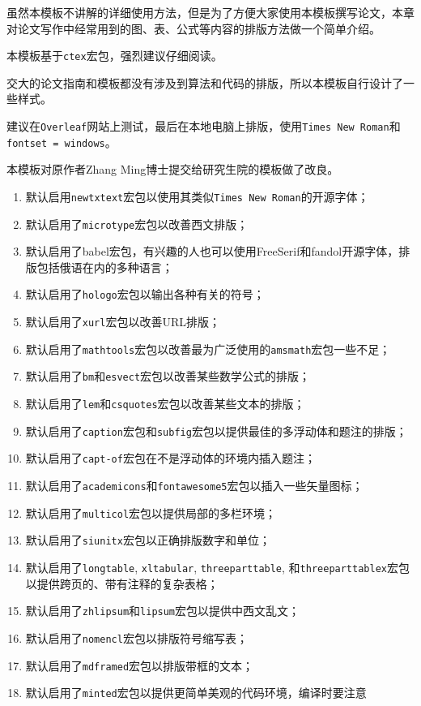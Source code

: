 

虽然本模板不讲解的详细使用方法，但是为了方便大家使用本模板撰写论文，本章对论文写作中经常用到的{\heiti 图、表、公式}等内容的排版方法做一个简单介绍。

\begin{mdframed}
本模板基于\texttt{ctex}宏包，强烈建议仔细阅读。

交大的论文指南和模板都没有涉及到算法和代码的排版，所以本模板自行设计了一些样式。

建议在\texttt{Overleaf}网站上测试，最后在本地电脑上排版，使用\texttt{Times New Roman}和\texttt{fontset = windows}。

本模板对原作者Zhang Ming博士提交给研究生院的模板做了改良。
\begin{enumerate}
  \item 默认启用\texttt{newtxtext}宏包以使用其类似\texttt{Times New Roman}的开源字体；
  \item 默认启用了\texttt{microtype}宏包以改善西文排版；
  \item 默认启用了babel宏包，有兴趣的人也可以使用FreeSerif和fandol开源字体，排版包括俄语在内的多种语言；
  \item 默认启用了\texttt{hologo}宏包以输出各种有关的符号；
  \item 默认启用了\texttt{xurl}宏包以改善URL排版；
  \item 默认启用了\texttt{mathtools}宏包以改善最为广泛使用的\texttt{amsmath}宏包一些不足；
  \item 默认启用了\texttt{bm}和\texttt{esvect}宏包以改善某些数学公式的排版；
  \item 默认启用了\texttt{lem}和\texttt{csquotes}宏包以改善某些文本的排版；
  \item 默认启用了\texttt{caption}宏包和\texttt{subfig}宏包以提供最佳的多浮动体和题注的排版；
  \item 默认启用了\texttt{capt-of}宏包在不是浮动体的环境内插入题注；
  \item 默认启用了\texttt{academicons}和\texttt{fontawesome5}宏包以插入一些矢量图标；
  \item 默认启用了\texttt{multicol}宏包以提供局部的多栏环境；
  \item 默认启用了\texttt{siunitx}宏包以正确排版数字和单位；
  \item 默认启用了\texttt{longtable}, \texttt{xltabular}, \texttt{threeparttable}, 和\texttt{threeparttablex}宏包以提供跨页的、带有注释的复杂表格；
  \item 默认启用了\texttt{zhlipsum}和\texttt{lipsum}宏包以提供中西文乱文；
  \item 默认启用了\texttt{nomencl}宏包以排版符号缩写表；
  \item 默认启用了\texttt{mdframed}宏包以排版带框的文本；
  \item 默认启用了\texttt{minted}宏包以提供更简单美观的代码环境，编译时要注意 
  

\end{enumerate}
\end{mdframed}
